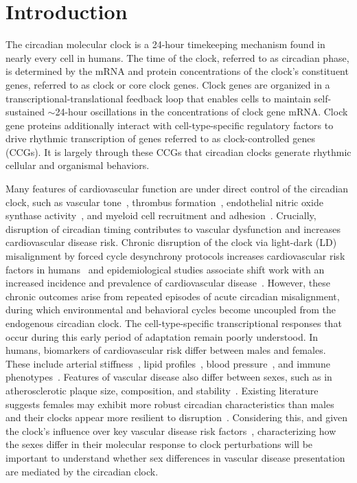 \documentclass[12pt]{article}
\begin{document}
\section*{Introduction}

The circadian molecular clock is a 24-hour timekeeping mechanism found in nearly every cell in
humans. The time of the clock, referred to as circadian phase, is determined by the mRNA and protein
concentrations of the clock's constituent genes, referred to as clock or core clock genes. Clock
genes are organized in a transcriptional-translational feedback loop that enables cells to maintain
self-sustained $\sim$24-hour oscillations in the concentrations of clock gene mRNA. Clock gene
proteins additionally interact with cell-type-specific regulatory factors to drive rhythmic
transcription of genes referred to as clock-controlled genes (CCGs). It is largely through these
CCGs that circadian clocks generate rhythmic cellular and organismal behaviors.

Many features of cardiovascular function are under direct control of the circadian clock, such as
vascular tone~\cite{ref1}, thrombus formation~\cite{ref2}, endothelial nitric oxide synthase
activity~\cite{ref3}, and myeloid cell recruitment and adhesion~\cite{ref4,ref5}. Crucially,
disruption of circadian timing contributes to vascular dysfunction and increases cardiovascular 
disease risk. Chronic disruption of the clock via light-dark (LD) misalignment by forced 
cycle desynchrony protocols increases cardiovascular risk factors in humans~\cite{ref6} 
and epidemiological studies associate shift work with an increased incidence and prevalence 
of cardiovascular disease~\cite{ref7,ref8,ref9}. However, these chronic outcomes arise from
repeated episodes of acute circadian misalignment, during which environmental and behavioral
cycles become uncoupled from the endogenous circadian clock. The cell-type-specific 
transcriptional responses that occur during this early period of adaptation remain 
poorly understood.
In humans, biomarkers of cardiovascular risk differ between males and females. These include
arterial stiffness~\cite{ref14}, lipid profiles~\cite{ref15,ref16}, blood pressure~\cite{ref17}, 
and immune phenotypes~\cite{ref18}. Features of vascular disease also differ between 
sexes, such as in atherosclerotic plaque size, composition, 
and stability~\cite{ref19,ref20}. Existing literature suggests females may exhibit 
more robust circadian characteristics than males and their clocks appear more resilient 
to disruption~\cite{ref21}. Considering this, and given the clock's influence over key 
vascular disease risk factors~\cite{ref22,ref23,ref24}, characterizing how the sexes differ 
in their molecular response to clock perturbations will be important to understand whether 
sex differences in vascular disease presentation are mediated by the circadian clock. 
\end{document}
